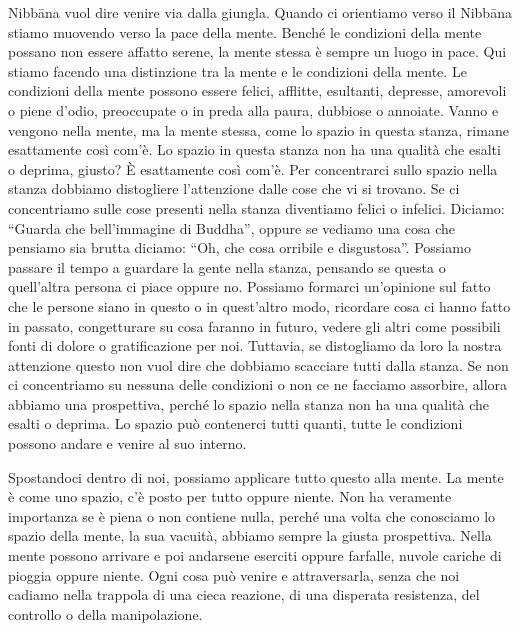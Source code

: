 Nibbāna vuol dire venire via dalla giungla. Quando ci orientiamo verso
il Nibbāna stiamo muovendo verso la pace della mente. Benché le
condizioni della mente possano non essere affatto serene, la mente
stessa è sempre un luogo in pace. Qui stiamo facendo una distinzione tra
la mente e le condizioni della mente. Le condizioni della mente possono
essere felici, afflitte, esultanti, depresse, amorevoli o piene d'odio,
preoccupate o in preda alla paura, dubbiose o annoiate. Vanno e vengono
nella mente, ma la mente stessa, come lo spazio in questa stanza, rimane
esattamente così com'è. Lo spazio in questa stanza non ha una qualità
che esalti o deprima, giusto? È esattamente così com'è. Per concentrarci
sullo spazio nella stanza dobbiamo distogliere l'attenzione dalle cose
che vi si trovano. Se ci concentriamo sulle cose presenti nella stanza
diventiamo felici o infelici. Diciamo: ``Guarda che bell'immagine di
Buddha'', oppure se vediamo una cosa che pensiamo sia brutta diciamo:
``Oh, che cosa orribile e disgustosa''. Possiamo passare il tempo a
guardare la gente nella stanza, pensando se questa o quell'altra persona
ci piace oppure no. Possiamo formarci un'opinione sul fatto che le
persone siano in questo o in quest'altro modo, ricordare cosa ci hanno
fatto in passato, congetturare su cosa faranno in futuro, vedere gli
altri come possibili fonti di dolore o gratificazione per noi. Tuttavia,
se distogliamo da loro la nostra attenzione questo non vuol dire che
dobbiamo scacciare tutti dalla stanza. Se non ci concentriamo su nessuna
delle condizioni o non ce ne facciamo assorbire, allora abbiamo una
prospettiva, perché lo spazio nella stanza non ha una qualità che esalti
o deprima. Lo spazio può contenerci tutti quanti, tutte le condizioni
possono andare e venire al suo interno.

Spostandoci dentro di noi, possiamo applicare tutto questo alla mente.
La mente è come uno spazio, c'è posto per tutto oppure niente. Non ha
veramente importanza se è piena o non contiene nulla, perché una volta
che conosciamo lo spazio della mente, la sua vacuità, abbiamo sempre la
giusta prospettiva. Nella mente possono arrivare e poi andarsene
eserciti oppure farfalle, nuvole cariche di pioggia oppure niente. Ogni
cosa può venire e attraversarla, senza che noi cadiamo nella trappola di
una cieca reazione, di una disperata resistenza, del controllo o della
manipolazione.

